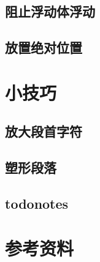 \documentclass[]{ctexart}
\begin{document}
\subsection{阻止浮动体浮动}


\subsection{放置绝对位置}\label{sec:abspos}


\section{小技巧}
\subsection{放大段首字符}


\subsection{塑形段落}


\subsection{todonotes}


\label{lstof:exercises}

\section{参考资料}
\printbibliography[heading=none]
\end{document}
